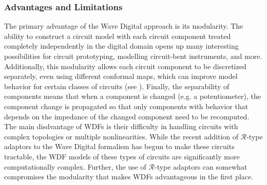 \documentclass[twoside,a4paper]{article}
\begin{document}
\subsubsection{Advantages and Limitations}
The primary advantage of the Wave Digital approach is its modularity.
The ability to construct a circuit model with each circuit component
treated completely independently in the digital domain opens up many
interesting possibilities for circuit prototyping, modelling circuit-bent
instruments, and more. Additionally, this modularity allows each circuit
component to be discretized separately, even using different conformal
maps, which can improve model behavior for certain classes of circuits
(see \cite{Germain}). Finally, the separability of components means that
when a component is changed (e.g. a potentiometer), the component change
is propagated so that only components with behavior that depends on the
impedance of the changed component need to be recomputed.
\newline\newline
The main disdvantage of WDFs is their difficulty in handling circuits with
complex topologies or multiple nonlinearities. While the recent addition
of $\mathcal{R}$-type adaptors to the Wave Digital formalism \cite{KurtThesis}
has begun to make these circuits tractable, the WDF models of these types of
circuits are significantly more computationally complex. Further, the use of
$\mathcal{R}$-type adaptors can somewhat compromises the modularity that makes
WDFs advantageous in the first place.
\end{document}
